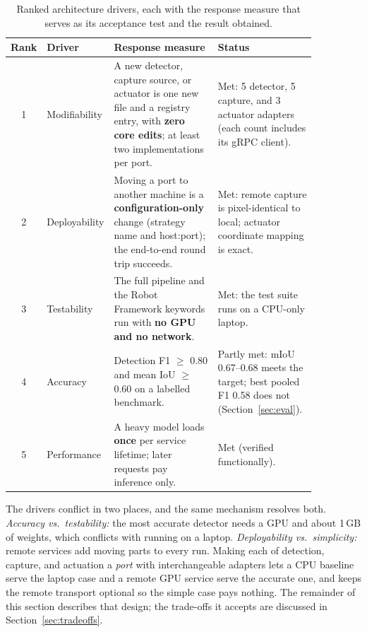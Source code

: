\documentclass[11pt,a4paper]{article}
\begin{document}
\begin{table}[htbp]
  \centering
  \caption{Ranked architecture drivers, each with the response measure that serves
  as its acceptance test and the result obtained.}
  \label{tab:drivers}
  \small
  \begin{tabular}{@{}c >{\raggedright\arraybackslash}p{0.15\linewidth}
                     >{\raggedright\arraybackslash}p{0.38\linewidth}
                     >{\raggedright\arraybackslash}p{0.33\linewidth}@{}}
    \toprule
    Rank & Driver & Response measure & Status \\
    \midrule
    1 & Modifiability &
      A new detector, capture source, or actuator is one new file and a registry
      entry, with \textbf{zero core edits}; at least two implementations per port. &
      Met: 5 detector, 5 capture, and 3 actuator adapters (each count includes its
      gRPC client). \\
    2 & Deployability &
      Moving a port to another machine is a \textbf{configuration-only} change
      (strategy name and host:port); the end-to-end round trip succeeds. &
      Met: remote capture is pixel-identical to local; actuator coordinate
      mapping is exact. \\
    3 & Testability &
      The full pipeline and the Robot Framework keywords run with \textbf{no GPU and
      no network}. &
      Met: the test suite runs on a CPU-only laptop. \\
    4 & Accuracy &
      Detection F1 $\geq$ 0.80 and mean IoU $\geq$ 0.60 on a labelled benchmark. &
      Partly met: mIoU 0.67--0.68 meets the target; best pooled F1 0.58 does not
      (Section~\ref{sec:eval}). \\
    5 & Performance &
      A heavy model loads \textbf{once} per service lifetime; later requests pay
      inference only. &
      Met (verified functionally). \\
    \bottomrule
  \end{tabular}
\end{table}

The drivers conflict in two places, and the same mechanism resolves both.
\emph{Accuracy vs.\ testability:} the most accurate detector needs a GPU and about
1\,GB of weights, which conflicts with running on a laptop. \emph{Deployability
vs.\ simplicity:} remote services add moving parts to every run. Making each of
detection, capture, and actuation a \emph{port} with interchangeable adapters lets a
CPU baseline serve the laptop case and a remote GPU service serve the accurate one,
and keeps the remote transport optional so the simple case pays nothing. The
remainder of this section describes that design; the trade-offs it accepts are
discussed in Section~\ref{sec:tradeoffs}.
\end{document}
